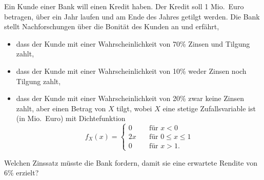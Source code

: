 \newcommand{\woche}{}
\newcommand{\nr}{2}
\newcommand{\thema}{}


\begin{Exercise}
Ein Kunde einer Bank will einen Kredit haben. Der Kredit soll 1 Mio.\
Euro betragen, \"{u}ber ein Jahr laufen und am Ende des Jahres getilgt
werden. Die Bank stellt Nachforschungen \"{u}ber die Bonit\"{a}t des Kunden
an und erf\"{a}hrt,

\begin{itemize}
	\item dass der Kunde mit einer Wahrscheinlichkeit von 70\% Zinsen und Tilgung zahlt,
	\item dass der Kunde mit einer Wahrscheinlichkeit von 10\% weder Zinsen noch Tilgung zahlt,
	\item dass der Kunde mit einer Wahrscheinlichkeit von 20\% zwar keine Zinsen
	zahlt, aber einen Betrag von $X$ tilgt, wobei $X$ eine stetige
	Zufallsvariable ist (in Mio.\ Euro) mit Dichtefunktion%
	\begin{equation*}
		f_{X}\left( x\right) =\left\{ 
		\begin{array}{ll}
			0 & \quad \text{f\"{u}r }x<0 \\ 
			2x & \quad \text{f\"{u}r }0\leq x\leq 1 \\ 
			0 & \quad \text{f\"{u}r }x>1.%
		\end{array}%
		\right.
	\end{equation*}
\end{itemize}

Welchen Zinssatz m\"{u}sste die Bank fordern, damit sie eine erwartete
Rendite von 6\% erzielt?
\end{Exercise}
